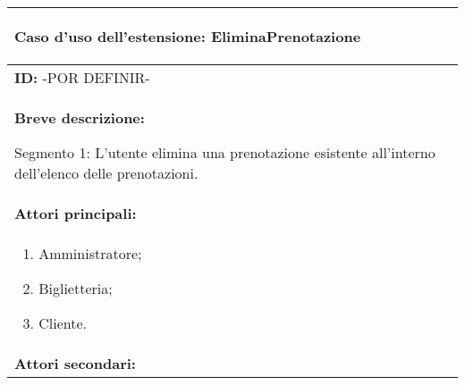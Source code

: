 \documentclass{article}
\begin{document}
\begin{table}[t]
    \centering
    \begin{tabular}{|p{\linewidth}|}
        \hline
        \cellcolor{gray!100}
        \color{white}
        \begin{center}
            \textbf{Caso d'uso dell'estensione:} EliminaPrenotazione
        \end{center} \\
        \hline
        \textbf{ID:} -POR DEFINIR- \\
        \hline
        \cellcolor{gray!20}
        \textbf{Breve descrizione:}
        
        Segmento 1: L'utente elimina una prenotazione esistente all'interno dell'elenco delle prenotazioni. \\
        \hline
        \textbf{Attori principali:} \\
        \begin{minipage}{\linewidth}
            \begin{enumerate}[noitemsep]
                \item Amministratore;
                \item Biglietteria;
                \item Cliente.
            \end{enumerate}
        \end{minipage}
        \vspace{0pt} \\
        \hline
        \textbf{Attori secondari:}
        

\end{tabular}
\end{table}
\end{document}
